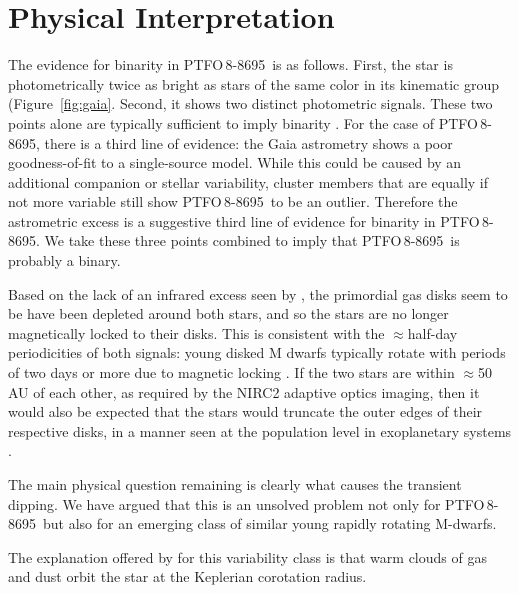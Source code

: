 \documentclass[12pt,twocolumn,tighten]{aastex62}
\newcommand{\ptfo}{PTFO$\,$8-8695}
\begin{document}
\section{Physical Interpretation}

The evidence for binarity in \ptfo\ is as follows.  First, the star is
photometrically twice as bright as stars of the same color in its
kinematic group (Figure~\ref{fig:gaia}.  Second, it shows two distinct
photometric signals.  These two points alone are typically sufficient
to imply binarity \citep{stauffer_rotevol_2018}.  For the case of
\ptfo, there is a third line of evidence: the Gaia astrometry shows a
poor goodness-of-fit to a single-source model.  While this could be
caused by an additional companion or stellar variability, cluster
members that are equally if not more variable still show \ptfo\ to be
an outlier.  Therefore the astrometric excess is a suggestive third
line of evidence for binarity in \ptfo.  We take these three points
combined to imply that \ptfo\ is probably a binary.

Based on the lack of an infrared excess seen by \citet{yu_tests_2015},
the primordial gas disks seem to be have been depleted around both
stars, and so the stars are no longer magnetically locked to their
disks.  This is consistent with the $\approx$half-day periodicities of
both signals: young disked M dwarfs typically rotate with periods of
two days or more due to magnetic locking \citep[{\it
e.g.},][]{rebull_rotation_2020}.  If the two stars are within
$\approx$50$\,$AU of each other, as required by the NIRC2 adaptive
optics imaging, then it would also be expected that the stars would
truncate the outer edges of their respective disks, in a manner seen
at the population level in exoplanetary systems
\citep{kraus_impact_2016,moe_impact_2019}.

The main physical question remaining is clearly what causes the
transient dipping. We have argued that this is an unsolved problem not
only for \ptfo\ but also for an emerging class of similar young
rapidly rotating M-dwarfs.

The explanation offered by \citet{stauffer_orbiting_2017} for this
variability class is that warm clouds of gas and dust orbit the star
at the Keplerian corotation radius.
\end{document}

